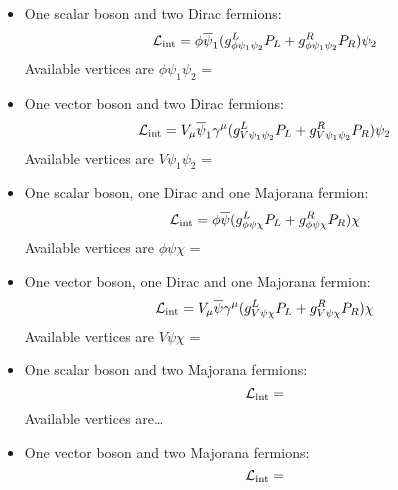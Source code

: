 \begin{itemize}
\item One scalar boson and two Dirac fermions:
\begin{equation}
{\cal L}_{\rm int} = \phi \overline{\psi}_1 ( g^L_{\phi\psi_1\psi_2} P_L +
g^R_{\phi\psi_1\psi_2} P_R ) \psi_2
\end{equation}
Available vertices are $\phi\psi_1\psi_2$ = 

\item One vector boson and two Dirac fermions:
\begin{equation}
{\cal L}_{\rm int} = V_\mu \overline{\psi}_1 \gamma^\mu
( g^L_{V\psi_1\psi_2} P_L + g^R_{V\psi_1\psi_2} P_R ) \psi_2
\end{equation}
Available vertices are $V\psi_1\psi_2$ = 

\item One scalar boson, one Dirac and one Majorana fermion:
\begin{equation}
  {\cal L}_{\rm int} = \phi \overline{\psi} 
  ( g^L_{\phi\psi\chi} P_L + g^R_{\phi\psi\chi} P_R ) \chi
\end{equation}
Available vertices are $ \phi\psi\chi$ = 

\item One vector boson, one Dirac and one Majorana fermion:
\begin{equation}
  {\cal L}_{\rm int} = V_\mu \overline{\psi} \gamma^\mu 
  ( g^L_{V\psi\chi} P_L + g^R_{V\psi\chi} P_R ) \chi
\end{equation}
Available vertices are $V\psi\chi$ = 

\item One scalar boson and two Majorana fermions:
\begin{equation}
{\cal L}_{\rm int} = 
\end{equation}
Available vertices are\ldots

\item One vector boson and two Majorana fermions:
\begin{equation}
{\cal L}_{\rm int} = 
\end{equation}
\end{itemize}


